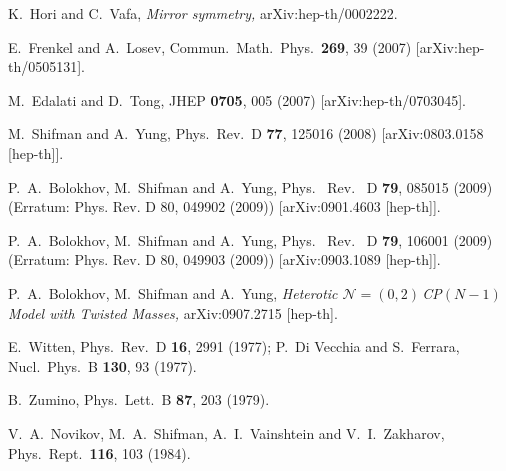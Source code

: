 \documentclass[epsfig,12pt]{article}
\newcommand{\nzt}{${\mathcal N}=(0,2)\,$}
\newcommand{\cpn}{CP$(N-1)\,$}
\begin{document}
{\begin{thebibliography}{99}
  K.~Hori and C.~Vafa,
{\em Mirror symmetry,}
  arXiv:hep-th/0002222.
  
E.~Frenkel and A.~Losev,
  Commun.\ Math.\ Phys.\  {\bf 269}, 39 (2007)
  [arXiv:hep-th/0505131].
  
 M.~Edalati and D.~Tong,
  JHEP {\bf 0705}, 005 (2007)
  [arXiv:hep-th/0703045].
  
  M.~Shifman and A.~Yung,
  Phys.\ Rev.\  D {\bf 77}, 125016 (2008)
  [arXiv:0803.0158 [hep-th]].
  
P.~A.~Bolokhov, M.~Shifman and A.~Yung,
  Phys. \ Rev. \ D {\bf 79}, 085015 (2009) (Erratum: Phys. Rev. D 80, 049902 (2009))
  [arXiv:0901.4603 [hep-th]].
  
  P.~A.~Bolokhov, M.~Shifman and A.~Yung,
  Phys. \ Rev. \ D {\bf 79}, 106001 (2009) (Erratum: Phys. Rev. D 80, 049903 (2009))
  [arXiv:0903.1089 [hep-th]].
  
  P.~A.~Bolokhov, M.~Shifman and A.~Yung,
{\em Heterotic \nzt \mbox{\cpn} Model with Twisted Masses,}
  arXiv:0907.2715 [hep-th].
  
  E.~Witten,
  Phys.\ Rev.\  D {\bf 16}, 2991 (1977);
  P.~Di Vecchia and S.~Ferrara,
  Nucl.\ Phys.\  B {\bf 130}, 93 (1977).

 B.~Zumino,
  Phys.\ Lett.\  B {\bf 87}, 203 (1979).

 V.~A.~Novikov, M.~A.~Shifman, A.~I.~Vainshtein and V.~I.~Zakharov,
  Phys.\ Rept.\  {\bf 116}, 103 (1984).
   

\end{thebibliography}}
\end{document}
